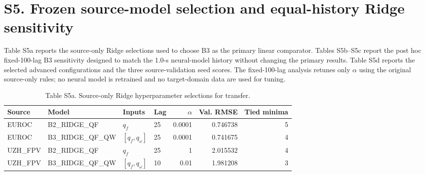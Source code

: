 \documentclass[11pt]{article}
\begin{document}
\section*{S5. Frozen source-model selection and equal-history Ridge sensitivity}
Table S5a reports the source-only Ridge selections used to choose B3 as the primary linear comparator. Tables S5b--S5c report the post hoc fixed-100-lag B3 sensitivity designed to match the 1.0-s neural-model history without changing the primary results. Table S5d reports the selected advanced configurations and the three source-validation seed scores. The fixed-100-lag analysis retunes only $\alpha$ using the original source-only rules; no neural model is retrained and no target-domain data are used for tuning.
\begin{table}[htbp]\centering
\caption*{Table S5a. Source-only Ridge hyperparameter selections for transfer.}
\small
\begin{tabular}{llllrrr}
\toprule
Source & Model & Inputs & Lag & $\alpha$ & Val. RMSE & Tied minima\\
\midrule
EUROC & B2\_RIDGE\_QF & $q_f$ & 25 & 0.0001 & 0.746738 & 5 \\
EUROC & B3\_RIDGE\_QF\_QW & $[q_f,q_\omega]$ & 25 & 0.0001 & 0.741675 & 4 \\
UZH\_FPV & B2\_RIDGE\_QF & $q_f$ & 25 & 1 & 2.015532 & 4 \\
UZH\_FPV & B3\_RIDGE\_QF\_QW & $[q_f,q_\omega]$ & 10 & 0.01 & 1.981208 & 3 \\
\bottomrule
\end{tabular}
\end{table}

\begin{table}[htbp]\centering
\caption*{Table S5b. Post hoc equal-history sensitivity for B3 Ridge. Fixed100 uses lag = 100 samples (1.0 s) in every context, while $\alpha$ is selected using the original source-only validation procedure. $\Delta$ = fixed100 $-$ primary source-selected-lag B3 Ridge.}
\small
{}
\end{table}
\end{document}
